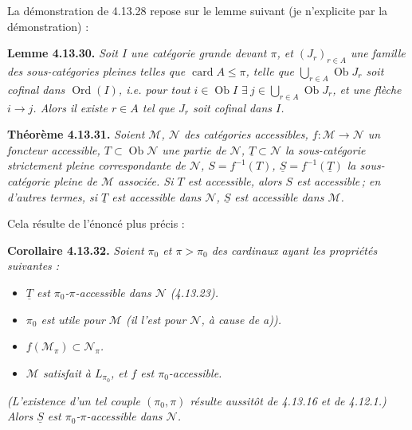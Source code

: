 \documentclass[11pt]{article}
\newcommand{\printedpage}[1]{\marginpar{\footnotesize p.~#1}}
\newcommand{\msp}[1]{\marginpar{\footnotesize [#1]}}
\newcommand{\Ob}{\operatorname{Ob}}
\newcommand{\card}{\operatorname{card}}
\newcommand{\Ord}{\operatorname{Ord}}
\begin{document}
La démonstration de 4.13.28 repose sur le lemme suivant (je n'explicite par la démonstration) : %

\printedpage{133}
\msp{page 350}
\textbf{Lemme 4.13.30.} \textit{Soit $I$ une catégorie grande devant $\pi$, et $(J_r)_{r\in A}$ une famille des sous-catégories pleines telles que $\card A\leqslant\pi$, telle que $\bigcup_{r\in A}\Ob J_r$ soit cofinal dans $\Ord(I)$, i.e. pour tout $i\in\Ob I$ $\exists\ j\in\bigcup_{r\in A}\Ob J_r$, et une flèche $i\longrightarrow j$. Alors il existe $r\in A$ tel que $J_r$ soit cofinal dans $I$.}

\textbf{Théorème 4.13.31.} \textit{Soient $\mathcal{M}$, $\mathcal{N}$ des catégories accessibles, $f:\mathcal{M}\longrightarrow\mathcal{N}$ un foncteur accessible, $T\subset\Ob\mathcal{N}$ une partie de $\mathcal{N}$, $\underline{T}\subset\mathcal{N}$ la sous-catégorie strictement pleine correspondante de $\mathcal{N}$, $S=f^{-1}(T)$, $\underline{S}=f^{-1}(\underline{T})$ la sous-catégorie pleine de $\mathcal{M}$ associée. Si $T$ est accessible, alors $S$ est accessible\,; en d'autres termes, si $\underline{T}$ est accessible dans $\mathcal{N}$, $\underline{S}$ est accessible dans $\mathcal{M}$.}

Cela résulte de l'énoncé plus précis :

\textbf{Corollaire 4.13.32.} \textit{Soient $\pi_0$ et $\pi>\pi_0$ des cardinaux ayant les propriétés suivantes :}

\msp{page 351}
\begin{itemize}[leftmargin=2.5em]
\item[\textit{a)}] \textit{$\underline{T}$ est $\pi_0$-$\pi$-accessible dans $\mathcal{N}$ (4.13.23).}
\item[\textit{b)}] \textit{$\pi_0$ est utile pour $\mathcal{M}$ (il l'est pour $\mathcal{N}$, à cause de a)).}
\item[\textit{c)}] \textit{$f(\mathcal{M}_\pi)\subset\mathcal{N}_\pi$.}
\item[\textit{d)}] \textit{$\mathcal{M}$ satisfait à $L_{\pi_0}$, et $f$ est $\pi_0$-accessible.}
\end{itemize}
\textit{(L'existence d'un tel couple $(\pi_0,\pi)$ résulte aussitôt de 4.13.16 et de 4.12.1.) Alors $\underline{S}$ est $\pi_0$-$\pi$-accessible dans $\mathcal{N}$.}
\end{document}
